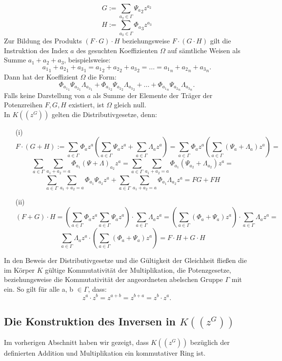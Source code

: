 {\[G := \sum_{a_2 \in \Gamma}^{} {\Psi_a}_2 z^{a_2}\]
\[H := \sum_{a_3 \in \Gamma}^{} {\Phi_a}_3 z^{a_3} \]
Zur Bildung des Produkts $(F\cdot G)\cdot H$ beziehungsweise $F\cdot(G\cdot H)$ gilt die Instruktion des Index $a$ des gesuchten Koeffizienten $\Omega$ auf sämtliche Weisen als Summe $a_1 + a_2 + a_3$, beispielsweise: 
\[{a_1}_1 + {a_2}_1 + {a_3}_1 = {a_1}_2 + {a_2}_2 + {a_3}_2 = ... =  {a_1}_n + {a_2}_n + {a_3}_n.\]
Dann hat der Koeffizient $\Omega$ die Form: 
\[\Phi_{{a_1}_1} \Psi_{{a_2}_1} \Lambda_{{a_3}_1} + \Phi_{{a_1}_2} \Psi_{{a_2}_2} \Lambda_{{a_3}_2} + ... + \Phi_{{a_1}_n} \Psi_{{a_2}_n} \Lambda_{{a_3}_n}.\]
Falls keine Darstellung von $a$ als Summe der Elemente der Träger der Potenzreihen $F, G, H$ existiert, ist $\Omega$ gleich null.\\
In $K\left(\left(z^{G}\right)\right)$ gelten die Distributivgesetze, denn:
\begin{enumerate}
\item[(i)]\[F\cdot(G + H) := \sum_{a \in \Gamma}^{} {\Phi_a} z^{a} \left( \sum_{a \in \Gamma}^{} {\Psi_a} z^{a} +  \sum_{a \in \Gamma}^{} {\Lambda_a} z^{a} \right) = \sum_{a \in \Gamma}^{} {\Phi_a} z^{a} \left(\sum_{a \in \Gamma}^{} \left({\Psi_a}+ \Lambda_a\right) z^{a}\right) = \]
\[\sum_{a \in \Gamma}^{}\sum_{a_1 + a_2 = a}^{}\Phi_{a_1} {\left(\Psi + \Lambda\right)}_{a_2}z^a = \sum_{a \in \Gamma}^{}\sum_{a_1 + a_2 = a}^{}\Phi_{a_1} \left(\Psi_{a_2} + \Lambda_{a_2}\right) z^a=\]
\[\sum_{a \in \Gamma}^{}\sum_{a_1 + a_2 = a}^{}\Phi_{a_1} \Psi_{a_2}z^a + \sum_{a \in \Gamma}^{}\sum_{a_1 + a_2 = a}^{}\Phi_{a_1} \Lambda_{a_2}z^a = FG + FH\]
\item[(ii)] \[(F + G) \cdot H = \left(\sum_{a \in \Gamma}^{} {\Phi_a} z^{a}  \sum_{a \in \Gamma}^{} {\Psi_a} z^{a}\right) \cdot \sum_{a \in \Gamma}^{} {\Lambda_a} z^{a} = \left(\sum_{a \in \Gamma}^{} \left({\Phi_a}+ \Psi_a\right) z^{a}\right)\cdot \sum_{a \in \Gamma}^{} {\Lambda_a} z^{a} =\]
\[ \sum_{a \in \Gamma}^{} {\Lambda_a} z^{a} \cdot \left(\sum_{a \in \Gamma}^{} \left({\Phi_a}+ \Psi_a\right) z^{a}\right) =   F\cdot H + G\cdot H\]
\end{enumerate}  
In den Beweis der Distributivgesetze und die Gültigkeit der Gleichheit fließen die im Körper $K$ gültige Kommutativität der Multiplikation, die Potenzgesetze, beziehungsweise die Kommutativität der angeordneten abelschen Gruppe $\Gamma$ mit ein. So gilt für alle a, b $\in \Gamma$, dass: 
\[z^a \cdot z^b = z^{a+b} = z^{b+a} = z^b \cdot z^a.\] 
}
%
\subsection{Die Konstruktion des Inversen in $K\left(\left(z^{G}\right)\right)$ }
%
%
%
%
%
Im vorherigen Abschnitt haben wir gezeigt, dass $K\left(\left(z^{G}\right)\right)$ bezüglich der definierten Addition und Multiplikation ein kommutativer Ring ist. 



